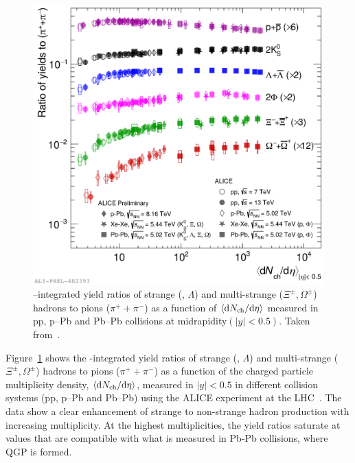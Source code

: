 \begin{figure}[htb]
  \centering
  \includegraphics[width=0.7\linewidth]{Figures/Chapter 1/img_ToPionRatios_1.pdf}
  \caption{\pt--integrated yield ratios of strange (\kzs, $\Lambda$) and multi-strange ($\Xi^\pm, \Omega^\pm$) hadrons to pions ($\pi^++\pi^-$) as a function of $\braket{\mathrm{d} N_\mathrm{ch}/\mathrm{d}\eta}$ measured in pp, p--Pb and Pb--Pb collisions at midrapidity$(\lvert y\rvert<0.5)$. Taken from~\cite{ALICE_figures}.}
  \label{fig:StrangenessEnhancement}
\end{figure}

Figure~\ref{fig:StrangenessEnhancement} shows the \pt-integrated yield ratios of strange (\kzs, $\Lambda$) and multi-strange ($\Xi^\pm, \Omega^\pm$) hadrons to pions ($\pi^++\pi^-$) as a function of the charged particle multiplicity density, $\braket{\mathrm{d} N_\mathrm{ch}/\mathrm{d}\eta}$, measured in $\lvert y\rvert<0.5$ in different collision systems (pp, p--Pb and Pb--Pb) using the ALICE experiment at the LHC~\cite{ALICE:2016fzo}. The data show a clear enhancement of strange to non-strange hadron production with increasing multiplicity. At the highest multiplicities, the yield ratios saturate at values that are compatible with what is measured in Pb-Pb collisions, where QGP is formed.





